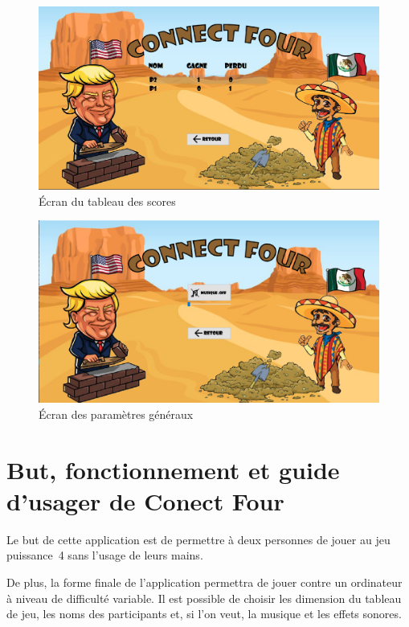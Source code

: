 \begin{figure}[H]
    \centering
    \includegraphics[width=6in]{img/4-tableauScore}
    \caption{Écran du tableau des scores}
\end{figure}

\begin{figure}[H]
    \centering
    \includegraphics[width=6in]{img/5-parametres}
    \caption{Écran des paramètres généraux}
\end{figure}

\section{But, fonctionnement et guide d'usager de Conect Four}

Le but de cette application est de permettre à deux personnes de jouer au jeu puissance~4 sans l’usage de leurs mains.

De plus, la forme finale de l’application permettra de jouer contre un ordinateur à niveau de difficulté variable.
Il est possible de choisir les dimension du tableau de jeu, les noms des participants et, si l’on veut, la musique et les effets sonores.

